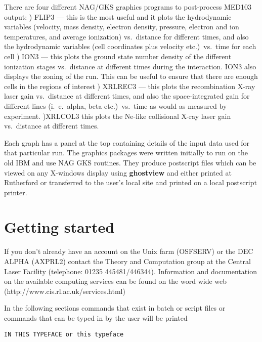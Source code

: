 There are four different NAG/GKS graphics programs to post-process MED103
output:
) FLIP3 --- this is the most useful and it plots 
the hydrodynamic variables (velocity, mass density, electron
density, pressure, electron and ion temperatures,
and average ionization) vs.\ distance
for different times, and also the hydrodynamic variables
(cell coordinates plus velocity etc.)\ vs.\ time
for each cell
) ION3 --- this plots the ground state number density
of the different ionization stages vs.\ distance at
different times during the interaction.
ION3 also displays the zoning of the run. This can be useful to
ensure that there are enough cells in the regions of interest
) XRLREC3 --- this plots the recombination X-ray laser gain vs.\
distance at different
times, and also the space-integrated gain for different
lines (i.\ e.\ alpha, beta etc.)\ vs.\ time as would
as measured by experiment.
)XRLCOL3
this plots the Ne-like collisional X-ray laser gain vs.\
distance at different
times.
\newline
 
Each graph has a panel at the top containing details
of the input data used for that particular run.
The graphics packages were written initially to run on the old IBM and use
NAG GKS routines. They produce postscript files  which can 
be viewed on any X-windows display using {\bf ghostview} and either
printed at Rutherford or transferred to the user's local site and
printed on a local postscript printer. 

\newpage 
\section{Getting started}

If you don't already have an account on the Unix farm (OSFSERV) or the DEC ALPHA
(AXPRL2) contact the Theory
and Computation group at the Central Laser Facility (telephone:
01235 445481/446344). Information and documentation on the available computing
services can be found on the word wide web (http://www.cis.rl.ac.uk/services.html)

In the following sections 
commands that exist in batch or script files or commands that can be typed in
by the user will be printed
\begin{verbatim}
IN THIS TYPEFACE or this typeface
\end{verbatim}

